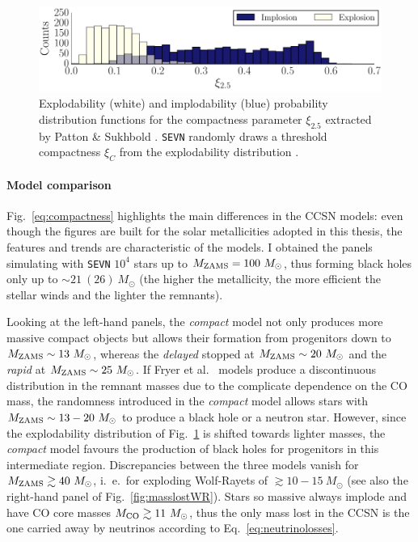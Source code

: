 \documentclass[a4paper,titlepage]{book}     	%
\newcommand{\sun}{\ensuremath{_\odot}}
\newcommand{\mzams}{M_\textup{ZAMS}}
\newcommand{\msun}{\ensuremath{M\sun}}
\begin{document}
\begin{figure}
	\centering
	\includegraphics[width=.9\textwidth]{./images/compactness.png}	
	\caption{Explodability (white) and implodability (blue) probability distribution functions for the compactness parameter $\xi_{2.5}$ extracted by Patton \& Sukhbold \cite{COcollapse}. \texttt{SEVN} randomly draws a threshold compactness $\xi_C$ from the explodability distribution \cite{mapelli2020_compactness}.}\label{fig:compactness}
\end{figure}


\paragraph{Model comparison} Fig.\ \ref{eq:compactness} highlights the main differences in the CCSN models: even though the figures are built for the solar metallicities adopted in this thesis, the features and trends are characteristic of the models. I obtained the panels simulating with \texttt{SEVN} $10^4$ stars up to $\mzams = 100~\msun$, thus forming black holes only up to $\sim 21~(26)~\msun$ (the higher the metallicity, the more efficient the stellar winds and the lighter the remnants).

Looking at the left-hand panels, the \emph{compact} model not only produces more massive compact objects but allows their formation from progenitors down to $\mzams \sim 13~\msun$, whereas the \emph{delayed} stopped at $\mzams \sim 20~\msun$ and the \emph{rapid} at $\mzams \sim 25~\msun$. If Fryer et al.\ \cite{Fryer2012} models produce a discontinuous distribution in the remnant masses due to the complicate dependence on the CO mass, the randomness introduced in the \emph{compact} model allows stars with $\mzams \sim 13-20~\msun$ to produce a black hole or a neutron star. However, since the explodability distribution of Fig.\ \ref{fig:compactness} is shifted towards lighter masses, the \emph{compact} model favours the production of black holes for progenitors in this intermediate region. Discrepancies between the three models vanish for $\mzams \gtrsim 40~\msun$, i.\ e.\ for exploding Wolf-Rayets of $\gtrsim 10-15~\msun$ (see also the right-hand panel of Fig.\ \ref{fig:masslostWR}). Stars so massive always implode and have CO core masses $M_{\rm CO} \gtrsim 11~\msun$, thus the only mass lost in the CCSN is the one carried away by neutrinos according to Eq.\ \ref{eq:neutrinolosses}. 
\end{document}
